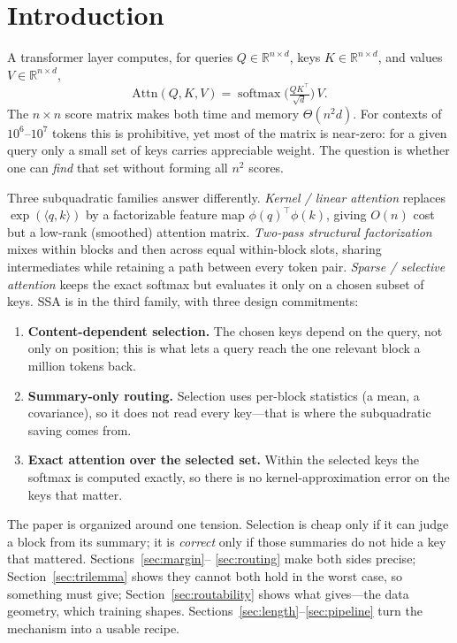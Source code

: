 \documentclass[11pt]{article}
\numberwithin{equation}{section}
\newcommand{\R}{\mathbb{R}}
\newcommand{\softmax}{\operatorname{softmax}}
\newcommand{\inner}[2]{\langle #1, #2\rangle}
\begin{document}
\section{Introduction}

A transformer layer computes, for queries $Q\in\R^{n\times d}$, keys $K\in\R^{n\times d}$, and values
$V\in\R^{n\times d}$,
\[
\mathrm{Attn}(Q,K,V) = \softmax\!\Big(\tfrac{QK^\top}{\sqrt{d}}\Big)\,V .
\]
The $n\times n$ score matrix makes both time and memory $\Theta(n^2 d)$. For contexts of $10^6$--$10^7$ tokens
this is prohibitive, yet most of the matrix is near-zero: for a given query only a small set of keys carries
appreciable weight. The question is whether one can \emph{find} that set without forming all $n^2$ scores.

Three subquadratic families answer differently. \emph{Kernel / linear attention} replaces
$\exp(\inner{q}{k})$ by a factorizable feature map $\phi(q)^\top\phi(k)$, giving $O(n)$ cost but a low-rank
(smoothed) attention matrix. \emph{Two-pass structural factorization} mixes within blocks and then across
equal within-block slots, sharing intermediates while retaining a path between every token pair.
\emph{Sparse / selective attention} keeps the exact softmax but evaluates it only on a chosen subset of keys.
SSA is in the third family, with three design commitments:
\begin{enumerate}
\item \textbf{Content-dependent selection.} The chosen keys depend on the query, not only on position; this is
  what lets a query reach the one relevant block a million tokens back.
\item \textbf{Summary-only routing.} Selection uses per-block statistics (a mean, a covariance), so it does not
  read every key---that is where the subquadratic saving comes from.
\item \textbf{Exact attention over the selected set.} Within the selected keys the softmax is computed exactly,
  so there is no kernel-approximation error on the keys that matter.
\end{enumerate}

The paper is organized around one tension. Selection is cheap only if it can judge a block from its summary;
it is \emph{correct} only if those summaries do not hide a key that mattered. Sections~\ref{sec:margin}--%
\ref{sec:routing} make both sides precise; Section~\ref{sec:trilemma} shows they cannot both hold in the worst
case, so something must give; Section~\ref{sec:routability} shows what gives---the data geometry, which
training shapes. Sections~\ref{sec:length}--\ref{sec:pipeline} turn the mechanism into a usable recipe.
\end{document}
